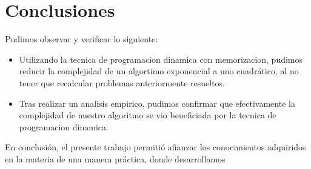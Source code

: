 \section{Conclusiones}

Pudimos observar y verificar lo siguiente:

\begin{itemize}

\item Utilizando la tecnica de programacion dinamica con memorizacion, pudimos reducir la complejidad de un algortimo exponencial a uno cuadrático, al no tener que recalcular problemas anteriormente resueltos.
\item Tras realizar un analisis empirico, pudimos confirmar que efectivamente la complejidad de nuestro algoritmo se vio beneficiada por la tecnica de programacion dinamica.
\end {itemize}

En conclusión, el presente trabajo permitió afianzar los conocimientos adquiridos en la materia de una manera práctica, donde desarrollamos 